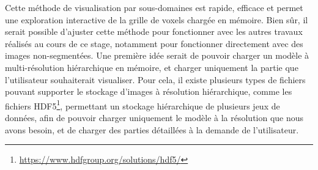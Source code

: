 {{		Cette méthode de visualisation par sous-domaines est rapide, efficace et permet une exploration interactive de la grille de voxels chargée en mémoire. Bien sûr, il serait possible d'ajuster cette méthode pour fonctionner avec les autres travaux réalisés au cours de ce stage, notamment pour fonctionner directement avec des images non-segmentées. Une première idée serait de pouvoir charger un modèle à multi-résolution hiérarchique en mémoire, et charger uniquement la partie que l'utilisateur souhaiterait visualiser. Pour cela, il existe plusieurs types de fichiers pouvant supporter le stockage d'images à résolution hiérarchique, comme les fichiers HDF5\footnote{\url{https://www.hdfgroup.org/solutions/hdf5/}}, permettant un stockage hiérarchique de plusieurs jeux de données, afin de pouvoir charger uniquement le modèle à la résolution que nous avons besoin, et de charger des parties détaillées à la demande de l'utilisateur.
	}

}

